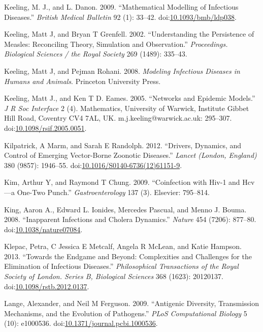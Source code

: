 \documentclass[]{article}
\theoremstyle{definition}
\theoremstyle{definition}
\theoremstyle{definition}
\theoremstyle{remark}
\begin{document}
\hypertarget{ref-keeling09}{}
Keeling, M. J., and L. Danon. 2009. ``Mathematical Modelling of
Infectious Diseases.'' \emph{British Medical Bulletin} 92 (1): 33--42.
doi:\href{https://doi.org/10.1093/bmb/ldp038}{10.1093/bmb/ldp038}.

\hypertarget{ref-keeling02}{}
Keeling, Matt J, and Bryan T Grenfell. 2002. ``Understanding the
Persistence of Measles: Reconciling Theory, Simulation and
Observation.'' \emph{Proceedings. Biological Sciences / the Royal
Society} 269 (1489): 335--43.

\hypertarget{ref-keeling08}{}
Keeling, Matt J, and Pejman Rohani. 2008. \emph{Modeling Infectious
Diseases in Humans and Animals}. Princeton University Press.

\hypertarget{ref-keeling05}{}
Keeling, Matt J., and Ken T D. Eames. 2005. ``Networks and Epidemic
Models.'' \emph{J R Soc Interface} 2 (4). Mathematics, University of
Warwick, Institute Gibbet Hill Road, Coventry CV4 7AL, UK.
m.j.keeling@warwick.ac.uk: 295--307.
doi:\href{https://doi.org/10.1098/rsif.2005.0051}{10.1098/rsif.2005.0051}.

\hypertarget{ref-kilpatrick12}{}
Kilpatrick, A Marm, and Sarah E Randolph. 2012. ``Drivers, Dynamics, and
Control of Emerging Vector-Borne Zoonotic Diseases.'' \emph{Lancet
(London, England)} 380 (9857): 1946--55.
doi:\href{https://doi.org/10.1016/S0140-6736(12)61151-9}{10.1016/S0140-6736(12)61151-9}.

\hypertarget{ref-kim09}{}
Kim, Arthur Y, and Raymond T Chung. 2009. ``Coinfection with Hiv-1 and
Hcv---a One-Two Punch.'' \emph{Gastroenterology} 137 (3). Elsevier:
795--814.

\hypertarget{ref-king08}{}
King, Aaron A., Edward L. Ionides, Mercedes Pascual, and Menno J. Bouma.
2008. ``Inapparent Infections and Cholera Dynamics.'' \emph{Nature} 454
(7206): 877--80.
doi:\href{https://doi.org/10.1038/nature07084}{10.1038/nature07084}.

\hypertarget{ref-klepac13}{}
Klepac, Petra, C Jessica E Metcalf, Angela R McLean, and Katie Hampson.
2013. ``Towards the Endgame and Beyond: Complexities and Challenges for
the Elimination of Infectious Diseases.'' \emph{Philosophical
Transactions of the Royal Society of London. Series B, Biological
Sciences} 368 (1623): 20120137.
doi:\href{https://doi.org/10.1098/rstb.2012.0137}{10.1098/rstb.2012.0137}.

\hypertarget{ref-lange09}{}
Lange, Alexander, and Neil M Ferguson. 2009. ``Antigenic Diversity,
Transmission Mechanisms, and the Evolution of Pathogens.'' \emph{PLoS
Computational Biology} 5 (10): e1000536.
doi:\href{https://doi.org/10.1371/journal.pcbi.1000536}{10.1371/journal.pcbi.1000536}.
\end{document}
